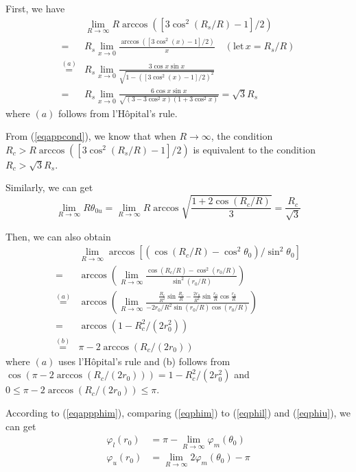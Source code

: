 \documentclass[journal, twoside]{IEEEtran}
\begin{document}
\begin{IEEEproof} First, we have 
\begin{equation} \label{eqappcond}
	\begin{split}
		& \lim_{R \to \infty} R \arccos([3\cos^2(R_s/R)-1]/2) \\
	  = & R_s \lim_{x \to 0} \frac{\arccos([3\cos^2(x)-1]/2)}{x} \quad (\textrm{let} \, x = R_s/R) \\
	  \overset{(a)}{=} & R_s \lim_{x \to 0} \frac{3 \cos x \sin x}{\sqrt{1-([3\cos^2(x)-1]/2)^2}} \\
	  = & R_s \lim_{x \to 0} \frac{6 \cos x \sin x}{\sqrt{(3-3\cos^2 x)(1+3\cos^2 x)}}
	  = \sqrt{3}R_s
	\end{split}	
\end{equation}
\noindent where $(a)$ follows from l'H\^{o}pital's rule.

From (\ref{eqappcond}), we know that when $R \to \infty$, the condition $R_c > R \arccos ([3\cos^2(R_s/R)-1]/2)$ is equivalent to the condition $R_c > \sqrt{3}R_s$.

Similarly, we can get 
\begin{equation} \label{eqappr0}
	\lim_{R \to \infty} R\theta_{0u} = \lim_{R \to \infty} R\arccos \sqrt{\frac{1+2\cos(R_c/R)}{3}} = \frac{R_c}{\sqrt{3}}
\end{equation}

Then, we can also obtain
\begin{equation} \label{eqappphim}
	\begin{split}
		& \lim_{R \to \infty} \arccos [(\cos(R_c/R) - \cos^2 \theta_0)/\sin^2 \theta_0] \\
	  = & \arccos (\lim_{R \to \infty} \frac{\cos(R_c/R) - \cos^2 (r_0/R)}{\sin^2 (r_0/R)} )\\
	  \overset{(a)}{=} & \arccos (\lim_{R \to \infty} \frac{\frac{R_c}{R^2} \sin \frac{R_c}{R} - \frac{2r_0}{R^2} \sin \frac{r_0}{R} \cos \frac{r_0}{R}}{-2r_0/R^2 \sin (r_0/R) \cos (r_0/R)}) \\
	  = & \arccos (1 - R_c^2/(2r_0^2))\\
	  \overset{(b)}{=} & \pi - 2\arccos(R_c/(2r_0))
	\end{split}
\end{equation}
\noindent where $(a)$ uses l'H\^{o}pital's rule and (b) follows from $\cos(\pi - 2\arccos(R_c/(2r_0))) = 1 - R_c^2/(2r_0^2)$ and $0 \leq \pi - 2\arccos(R_c/(2r_0)) \leq \pi$.

According to (\ref{eqappphim}), comparing (\ref{eqphim}) to (\ref{eqphil}) and (\ref{eqphiu}), we can get 
\begin{align}	
	 \varphi_l(r_0) & = \pi - \lim \limits_{R \to \infty} \varphi_m(\theta_0) \label{eqappphil}\\
	 \varphi_u(r_0) & = \lim \limits_{R \to \infty} 2\varphi_m(\theta_0) - \pi \label{eqappphiu}
\end{align}


\end{IEEEproof}
\end{document}
